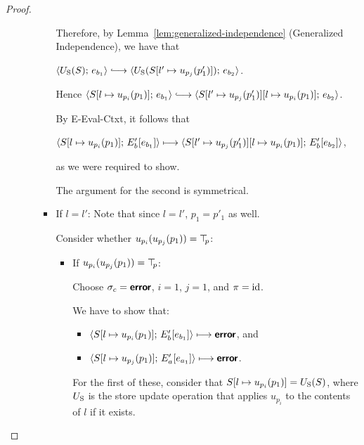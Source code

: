 \begin{proof}
\begin{enumerate}
\begin{enumerate}
\begin{itemize}
        Therefore, by Lemma~\ref{lem:generalized-independence}
        (Generalized Independence), we have that

        $\config{\Ustore(S)}{e_{b_1}} \parstepsto
        \config{\Ustore(\extSRaw{S}{l'}{u_{p_j}(p'_1)})}{e_{b_2}}$.

        Hence $\config{\extSRaw{S}{l}{u_{p_i}(p_1)}}{e_{b_1}}
        \parstepsto
        \config{\extSRaw{\extSRaw{S}{l'}{u_{p_j}(p'_1)}}{l}{u_{p_i}(p_1)}}{e_{b_2}}$.

        By {\sc E-Eval-Ctxt}, it follows that

        $\langle S[l \mapsto u_{p_i}(p_1)];\, E'_b\hspace{-0.5mm}\left[e_{b_1}\right] \rangle
        \longmapsto
        \langle S[l' \mapsto u_{p_j}(p'_1)][l \mapsto u_{p_i}(p_1)];\, E'_b\hspace{-0.5mm}\left[e_{b_2}\right] \rangle$,

        as we were required to show.

        The argument for the second is symmetrical.

      \item If $l = l'$:
        Note that since $l = l'$, $p_1 = p'_1$ as well.

        Consider whether $u_{p_i}(u_{p_j}(p_1)) = \top\hspace{-0.85mm}_{p}$:
        \begin{itemize}
        \item If $u_{p_i}(u_{p_j}(p_1)) = \top\hspace{-0.85mm}_{p}$:

          Choose $\sigma_c = \textbf{\textsf{error}}$, $i = 1$, $j = 1$, and $\pi =
          \mathrm{id}$.

          We have to show that:

          \begin{itemize}
          \item
            $\langle S[l \mapsto u_{p_i}(p_1)];\, E'_b\hspace{-0.5mm}\left[e_{b_1}\right] \rangle
            \longmapsto \textbf{\textsf{error}}$, and
          \item
            $\langle S[l \mapsto u_{p_j}(p_1)];\, E'_a\hspace{-0.5mm}\left[e_{a_1}\right] \rangle
            \longmapsto \textbf{\textsf{error}}$.
          \end{itemize}

          For the first of these, consider that
          $S[l \mapsto u_{p_i}(p_1)] = U_{\mathrm{S}}(S)$, where $U_{\mathrm{S}}$ is the
          store update operation that applies $u_{p_i}$ to the
          contents of $l$ if it exists.


\end{itemize}
\end{itemize}
\end{enumerate}
\end{enumerate}
\end{proof}
